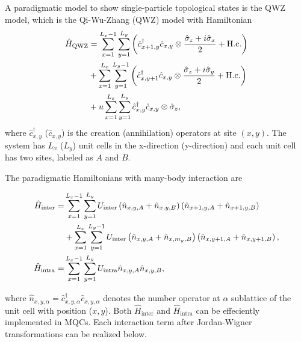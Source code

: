 \documentclass[longbibliography, aps, prx, amsmath, amssymb, amsfonts, twocolumn,superscriptaddress, footinbib]{revtex4-1}
\begin{document}
	A paradigmatic model to show single-particle topological states is the QWZ model, which is the Qi-Wu-Zhang (QWZ) model with Hamiltonian
	\begin{align}
		\hat{H}_{\text{QWZ}} &=  \sum_{{x}=1}^{L_{x}-1} \sum_{{y}=1}^{L_{y}}\left(\hat{c}_{{x}+1, {y}}^{\dagger} \hat{c}_{{x}, {y}} \otimes \frac{\hat{\sigma}_{z}+i \hat{\sigma}_{x}}{2}+\mathrm{H.c.}\right) \notag\\
		& +\sum_{{x}=1}^{L_{x}} \sum_{{y}=1}^{L_{y}-1}\left(\hat{c}_{{x}, {y}+1}^{\dagger} \hat{c}_{{x}, {y}} \otimes \frac{\hat{\sigma}_{z}+i \hat{\sigma}_{y}}{2}+\mathrm{H.c.}\right) \notag\\
		& +u \sum_{{x}=1}^{L_{x}} \sum_{{y}=1}^{L_{y}} \hat{c}_{{x}, {y}}^{\dagger} \hat{c}_{{x}, {y}} \otimes \hat{\sigma}_{z},
	\end{align}
	where $\hat{c}_{{x}, {y}}^{\dagger}$ ($\hat{c}_{{x}, {y}}$) is the creation (annihilation) operators at site $({x},{y})$. The system has $L_x$ ($L_y$) unit cells in the x-direction (y-direction) and each unit cell has two sites, labeled as $A$ and $B$. 

	The paradigmatic Hamiltonians with many-body interaction are
	\begin{widetext}
		\begin{align}
			\hat{H}_{\text{inter}} = &\sum_{{x}=1}^{L_{x}-1} \sum_{{y}=1}^{L_{y}}  U_{\text{inter}} \left(\hat{n}_{{x}, {y}, A}+\hat{n}_{{x}, {y}, B}\right) \left(\hat{n}_{{x}+1, {y}, A}+\hat{n}_{{x}+1, {y}, B}\right)\notag\\
			& + 
			\sum_{{x}=1}^{L_{x}} \sum_{{y}=1}^{L_{y}-1}  U_{\text{inter}} \left(\hat{n}_{{x}, {y}, A}+\hat{n}_{{x}, m_y, B}\right) \left(\hat{n}_{{x}, {y}+1, A}+\hat{n}_{{x}, {y}+1, B}\right),\\
			\hat{H}_{\text{intra}} =& \sum_{{x}=1}^{L_{x}-1} \sum_{{y}=1}^{L_{y}}  U_{\text{intra}} \hat{n}_{{x}, {y}, A} \hat{n}_{{x}, {y}, B},
		\end{align}
	\end{widetext}
	where $\hat{n}_{{x},{y},\alpha}=\hat{c}_{x,y,\alpha}^{\dagger}\hat{c}_{x,y,\alpha}$ denotes the number operator at $\alpha$ sublattice of the unit cell with position (${x},{y}$).
	Both $\hat{H}_{\text{inter}}$ and $\hat{H}_{\text{intra}}$ can be effeciently implemented in MQCs. Each interaction term after Jordan-Wigner transformations can be realized below.
\end{document}
